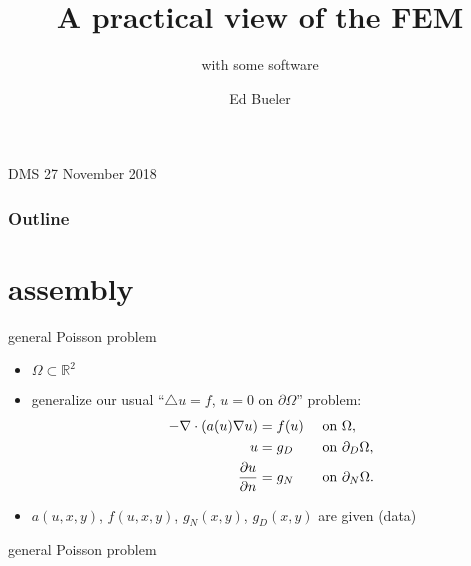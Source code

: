 \documentclass[hide notes,intlimits,usenames,dvipsnames]{beamer}
\title{A practical view of the FEM}
\subtitle{with some software}
\author[Bueler]{Ed Bueler}
\institute[UAF]{
  \scriptsize Dept of Mathematics and Statistics \\

  University of Alaska Fairbanks
}
\date{}
\newcommand{\RR}{\mathbb{R}}
\newcommand{\Div}{\nabla\cdot}
\newcommand{\eps}{\epsilon}
\newcommand{\grad}{\nabla}
\begin{document}
\begin{frame}
\vspace{10mm}
  \titlepage
  \begin{center}
  \tiny DMS \hfill 27 November 2018
  \end{center}
\end{frame}


\begin{frame}
    \frametitle{Outline}
    \tableofcontents
\end{frame}

\section{assembly}

\begin{frame}{general Poisson problem}
\begin{itemize}
\item $\Omega \subset \RR^2$ %
\item generalize our usual ``$\triangle u = f$, $u=0$ on $\partial\Omega$'' problem:
\begin{align*}
- \Div \left(a(u) \grad u\right) &= f(u)  &&\text{ on } \Omega, \\
u &= g_D &&\text{ on } \partial_D \Omega, \notag \\
\frac{\partial u}{\partial n} &= g_N &&\text{ on } \partial_N \Omega. \notag
\end{align*}
\item $a(u,x,y)$, $f(u,x,y)$, $g_N(x,y)$, $g_D(x,y)$ are given (data)
\end{itemize}
\end{frame}

\begin{frame}{general Poisson problem}
\begin{center}

\end{center}
\end{frame}
\end{document}
